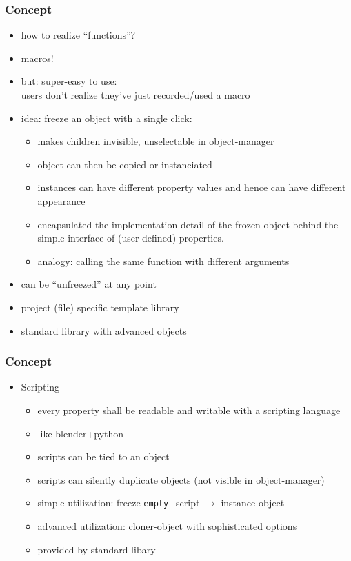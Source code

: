 \documentclass{beamer}
\begin{document}
  \begin{frame}[t]\frametitle{Concept}
    \begin{itemize}
      \item how to realize ``functions''?
      \item macros!
      \item but: super-easy to use: \\users don't realize they've just recorded/used a macro
      \item idea: freeze an object with a single click:
        \begin{itemize}
          \item makes children invisible, unselectable in object-manager
          \item object can then be copied or instanciated
          \item instances can have different property values and hence can have different appearance
          \item encapsulated the implementation detail of the frozen object behind the simple interface of (user-defined) properties.
          \item analogy: calling the same function with different arguments
        \end{itemize}
      \item can be ``unfreezed'' at any point 
      \item project (file) specific template library
      \item standard library with advanced objects
    \end{itemize}
  \end{frame}

  \begin{frame}[t]\frametitle{Concept}
    \begin{itemize}
      \item Scripting
      \begin{itemize}
        \item every property shall be readable and writable with a scripting language
        \item like blender+python
        \item scripts can be tied to an object
        \item scripts can silently duplicate objects (not visible in object-manager)
        \item simple utilization: freeze \texttt{empty}+script $\rightarrow$ instance-object
        \item advanced utilization: cloner-object with sophisticated options
        \item provided by standard libary
      \end{itemize}
    \end{itemize}
  \end{frame}
\end{document}
